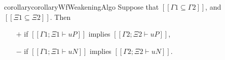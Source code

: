 \begin{restatable}{corollary}{corollaryWfWeakeningAlgo}
    \label{lemma:wf-weakening-algo}
    Suppose that $[[Γ1 ⊆ Γ2]]$,
    and $[[Ξ1 ⊆ Ξ2]]$. Then
    \begin{itemize}
        \item[$+$] if $[[Γ1 ; Ξ1 ⊢ uP]]$ implies $[[Γ2 ; Ξ2 ⊢ uP]]$,
        \item [$-$] if $[[Γ1 ; Ξ1 ⊢ uN]]$ implies $[[Γ2 ; Ξ2 ⊢ uN]]$.
    \end{itemize}
\end{restatable}

